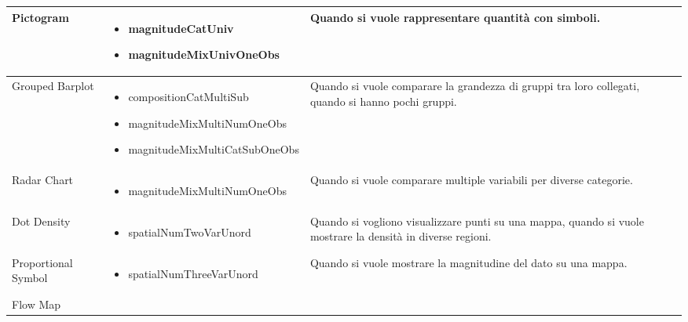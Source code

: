 \begin{xltabular}{\columnwidth}{|p{0.15\columnwidth}|X|p{0.27\columnwidth}|}
    \hline
    Pictogram & 
    \vspace{-3.5mm}
    \begin{itemize}[noitemsep,topsep=0pt, left=0pt]
        \item magnitudeCatUniv
        \item magnitudeMixUnivOneObs
    \end{itemize} & 
    Quando si vuole rappresentare quantità con simboli. \\
    \hline
    Grouped Barplot & 
    \vspace{-3.5mm}
    \begin{itemize}[noitemsep,topsep=0pt, left=0pt]
        \item compositionCatMultiSub
        \item magnitudeMixMultiNumOneObs
        \item magnitudeMixMultiCatSubOneObs
    \end{itemize} & 
    Quando si vuole comparare la grandezza di gruppi tra loro collegati, quando si hanno pochi gruppi. \\
    \hline
    Radar Chart & 
    \vspace{-3.5mm}
    \begin{itemize}[noitemsep,topsep=0pt, left=0pt]
        \item magnitudeMixMultiNumOneObs
    \end{itemize} & 
    Quando si vuole comparare multiple variabili per diverse categorie. \\
    \hline
    Dot Density & 
    \vspace{-3.5mm}
    \begin{itemize}[noitemsep,topsep=0pt, left=0pt]
        \item spatialNumTwoVarUnord
    \end{itemize} & 
    Quando si vogliono visualizzare punti su una mappa, quando si vuole mostrare la densità in diverse regioni. \\
    \hline
    Proportional Symbol & 
    \vspace{-3.5mm}
    \begin{itemize}[noitemsep,topsep=0pt, left=0pt]
        \item spatialNumThreeVarUnord
    \end{itemize} & 
    Quando si vuole mostrare la magnitudine del dato su una mappa. \\
    \hline
    Flow Map & 
    \vspace{-3.5mm}
    \begin{itemize}[noitemsep,topsep=0pt, left=0pt]

\end{itemize}
\end{xltabular}

